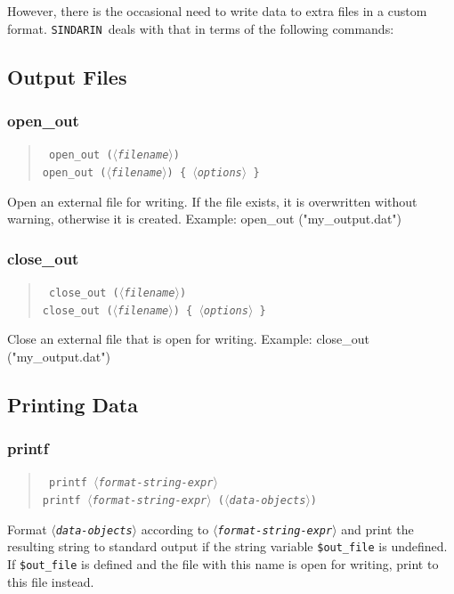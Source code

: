 \documentclass[12pt]{book}
\newenvironment{code}%
  {\begingroup\footnotesize
   \quote
   \verbatim}%
  {\endverbatim
   \endquote
   \endgroup\noindent}
\newenvironment{syntax}%
  {\begin{quote}
   \begin{flushleft}\tt}%
  {\end{flushleft}
   \end{quote}}
\newcommand{\var}[1]{$\langle$\textit{#1}$\rangle$}
\newcommand{\ttt}[1]{\texttt{#1}}
\newcommand{\sindarin}{\texttt{SINDARIN}}
\begin{document}
However, there is the occasional need to write data to extra files in a custom
format.  \sindarin\ deals with that in terms of the following commands:

\subsection{Output Files}

\subsubsection{open\_out}
\begin{syntax}
open\_out (\var{filename}) \\
open\_out (\var{filename}) \{ \var{options} \}
\end{syntax}
Open an external file for writing.  If the file exists, it is overwritten
without warning, otherwise it is created.  Example:
\begin{code}
open_out ("my_output.dat")
\end{code}


\subsubsection{close\_out}
\begin{syntax}
close\_out (\var{filename}) \\
close\_out (\var{filename}) \{ \var{options} \}
\end{syntax}
Close an external file that is open for writing.  Example:
\begin{code}
close_out ("my_output.dat")
\end{code}


\subsection{Printing Data}

\subsubsection{printf}
\begin{syntax}
printf \var{format-string-expr} \\
printf \var{format-string-expr} (\var{data-objects})
\end{syntax}
Format \ttt{\var{data-objects}} according to \ttt{\var{format-string-expr}}
and print the resulting string to standard output if the string variable
\ttt{\$out\_file} is undefined.  If \ttt{\$out\_file} is defined and the file
with this name is open for writing, print to this file instead.
\end{document}

